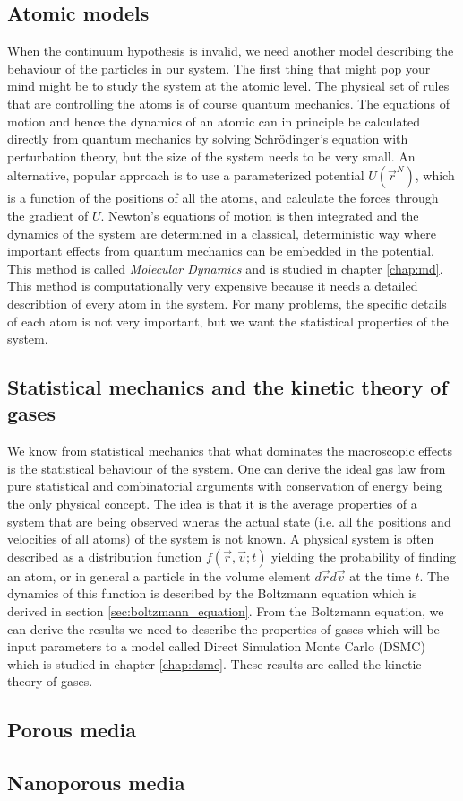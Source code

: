 \subsection{Atomic models}
When the continuum hypothesis is invalid, we need another model describing the behaviour of the particles in our system. The first thing that might pop your mind might be to study the system at the atomic level. The physical set of rules that are controlling the atoms is of course quantum mechanics. The equations of motion and hence the dynamics of an atomic can in principle be calculated directly from quantum mechanics by solving Schrödinger's equation with perturbation theory, but the size of the system needs to be very small. An alternative, popular approach is to use a parameterized potential $U(\vec r^N)$, which is a function of the positions of all the atoms, and calculate the forces through the gradient of $U$. Newton's equations of motion is then integrated and the dynamics of the system are determined in a classical, deterministic way where important effects from quantum mechanics can be embedded in the potential. This method is called \textit{Molecular Dynamics} and is studied in chapter \ref{chap:md}. This method is computationally very expensive because it needs a detailed describtion of every atom in the system. For many problems, the specific details of each atom is not very important, but we want the statistical properties of the system.
\subsection{Statistical mechanics and the kinetic theory of gases}
We know from statistical mechanics that what dominates the macroscopic effects is the statistical behaviour of the system. One can derive the ideal gas law from pure statistical and combinatorial arguments with conservation of energy being the only physical concept\cite{ravndal2008statmech}. The idea is that it is the average properties of a system that are being observed wheras the actual state (i.e. all the positions and velocities of all atoms) of the system is not known. A physical system is often described as a distribution function $f(\vec r, \vec v; t)$ yielding the probability of finding an atom, or in general a particle in the volume element $d\vec r d\vec v$ at the time $t$. The dynamics of this function is described by the Boltzmann equation which is derived in section \ref{sec:boltzmann_equation}. From the Boltzmann equation, we can derive  the results we need to describe the properties of gases which will be input parameters to a model called Direct Simulation Monte Carlo (DSMC) which is studied in chapter \ref{chap:dsmc}. These results are called the kinetic theory of gases.
\subsection{Porous media}


\subsection{Nanoporous media}